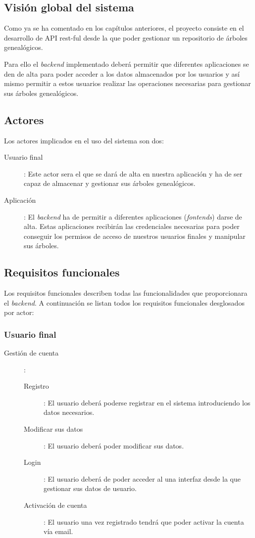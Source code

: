 \subsection{Visión global del sistema}
Como ya se ha comentado en los capítulos anteriores, el proyecto consiste en el desarrollo de API rest-ful desde la que poder gestionar un repositorio de árboles genealógicos.

Para ello el \textit{backend} implementado deberá permitir que diferentes aplicaciones se den de alta para poder acceder a los datos almacenados por los usuarios y así mismo permitir a estos usuarios 
realizar las operaciones necesarias para gestionar sus árboles genealógicos.

\subsection{Actores}
Los actores implicados en el uso del sistema son dos:

\begin{description}
\item[Usuario final]:\newline
Este actor sera el que se dará de alta en nuestra aplicación y ha de ser capaz de almacenar y gestionar sus árboles genealógicos.

 
\item[Aplicación]:\newline		
El \textit{backend} ha de permitir a diferentes aplicaciones (\textit{fontends}) darse de alta. Estas aplicaciones recibirán las credenciales necesarias para poder conseguir los permisos de acceso de nuestros usuarios finales y manipular sus árboles.
\end{description}

\subsection{Requisitos funcionales}
Los requisitos funcionales describen todas las funcionalidades que proporcionara el \textit{backend}. A continuación se listan todos los requisitos funcionales desglosados por actor:

\subsubsection{Usuario final}
\begin{description}
\item[Gestión de cuenta]:
	\begin{description}
	\item[Registro]:
	El usuario deberá poderse registrar en el sistema introduciendo los datos necesarios.
	\item[Modificar sus datos]:
	El usuario deberá poder modificar sus datos.
	\item[Login]:
	El usuario deberá de poder acceder al una interfaz desde la que gestionar sus datos de usuario.
	\item[Activación de cuenta]:
	El usuario una vez registrado tendrá que poder activar la cuenta vía email.
\end{description}
\end{description}		


